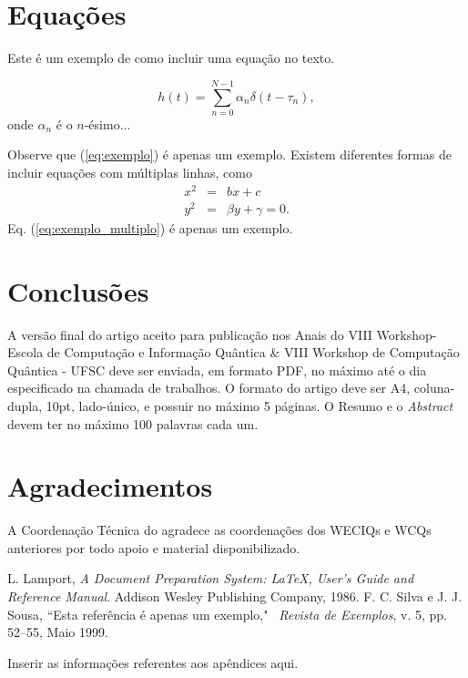 \documentclass{weciq}
\begin{document}
\section{Equa\c{c}\~{o}es}

Este é um exemplo de como incluir uma equação no texto.

\begin{equation}\label{eq:exemplo}
    h(t)=\sum_{n=0}^{N-1} \alpha_n\delta(t-\tau_n),
\end{equation}
onde $\alpha_n$ é o $n$-ésimo...

Observe que (\ref{eq:exemplo}) é apenas um exemplo. Existem diferentes formas de incluir equações com múltiplas linhas, como
\begin{equation} \label{eq:exemplo_multiplo}
    \begin{array}{ccl}
        x^2 & = & bx+c\\
        y^2 & = &\beta y+\gamma=0.
    \end{array}
\end{equation}
Eq. (\ref{eq:exemplo_multiplo}) é apenas um exemplo.

\section{Conclusões}
A versão final do artigo aceito para publicação nos Anais do VIII Workshop-Escola de Computação e Informação Quântica \& VIII Workshop de Computação Quântica - UFSC  deve ser enviada, em formato PDF, no máximo até o dia especificado na chamada de trabalhos. O formato do artigo deve ser A4, coluna-dupla, 10pt, lado-único, e possuir no máximo 5 páginas. O Resumo e o \emph{Abstract} devem ter no máximo 100 palavras cada um.

\section*{Agradecimentos}
A Coordenação Técnica do \weciqwcq agradece as coordenações dos WECIQs e WCQs anteriores por todo apoio e material disponibilizado.

\begin{thebibliography}{99}
 L. Lamport, \textit{A Document Preparation System: \LaTeX, User's
Guide and Reference Manual}. Addison Wesley Publishing Company,
1986.
 F. C. Silva e J. J. Sousa, ``Esta referência é apenas um exemplo," ~\textit{Revista de Exemplos}, v. 5, pp. 52--55, Maio
1999.
\end{thebibliography}


\appendix
Inserir as informações referentes aos apêndices aqui.
\end{document}
